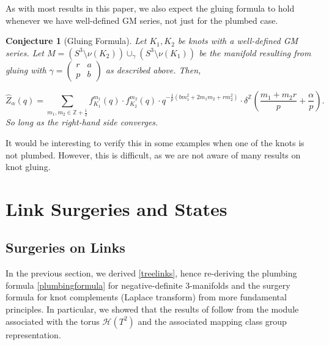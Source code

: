 \documentclass{article}
\newcommand{\Z}{{\mathbb Z}}
\newtheorem{conjecture}{Conjecture}
\numberwithin{corollary}{theorem}
\numberwithin{corollary}{proposition}
\begin{document}
As with most results in this paper, we also expect the gluing formula to hold whenever we have well-defined GM series, not just for the plumbed case. 

\begin{conjecture}[Gluing Formula]
    Let $K_1,K_2$ be knots with a well-defined GM series. Let $M = (S^3 \setminus\nu(K_2))\cup_\gamma (S^3 \setminus\nu(K_1))$ be the manifold resulting from gluing with $\gamma = \begin{pmatrix}
    r&a\\
    p&b
\end{pmatrix}$ as described above. Then,
    
    $$\hat{Z}_{\alpha}(q) = \sum_{m_1,m_2 \in \mathbb{Z}+\frac{1}{2}} f^{m_1}_{K_1}(q)\cdot f^{m_2}_{K_2}(q) \cdot  q^{-\frac{1}{p}(b m_{1}^{2}+2 m_{1} m_{2}+ r m_{2}^{2})} \cdot \delta^\Z\left(\frac{m_{1}+m_{2} r}{p}+ \frac{\alpha}{p}  \right). $$
So long as the right-hand side converges. 
\end{conjecture}

It would be interesting to verify this in some examples when one of the knots is not plumbed. However, this is difficult, as we are not aware of many results on knot gluing. 













\section{Link Surgeries and States}\label{amplitudesandstates}










\subsection{Surgeries on Links}\label{partial_surg_section}

In the previous section, we derived \eqref{treelinks}, hence re-deriving the plumbing formula \eqref{plumbingformula} for negative-definite 3-manifolds and the surgery formula for knot complements (Laplace transform) from more fundamental principles. In particular, we showed that the results of \cite{GM} follow from the module associated with the torus $\mathcal{H}(T^2)$ and the associated mapping class group representation. 
\end{document}
